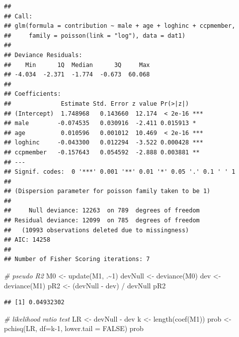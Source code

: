 \documentclass[
]{ctexart}
\newenvironment{Shaded}{\begin{snugshade}}{\end{snugshade}}
\newcommand{\AttributeTok}[1]{\textcolor[rgb]{0.77,0.63,0.00}{#1}}
\newcommand{\CommentTok}[1]{\textcolor[rgb]{0.56,0.35,0.01}{\textit{#1}}}
\newcommand{\ConstantTok}[1]{\textcolor[rgb]{0.00,0.00,0.00}{#1}}
\newcommand{\DecValTok}[1]{\textcolor[rgb]{0.00,0.00,0.81}{#1}}
\newcommand{\FunctionTok}[1]{\textcolor[rgb]{0.00,0.00,0.00}{#1}}
\newcommand{\NormalTok}[1]{#1}
\newcommand{\OtherTok}[1]{\textcolor[rgb]{0.56,0.35,0.01}{#1}}
\newcommand{\SpecialCharTok}[1]{\textcolor[rgb]{0.00,0.00,0.00}{#1}}
\begin{document}
\begin{verbatim}
## 
## Call:
## glm(formula = contribution ~ male + age + loghinc + ccpmember, 
##     family = poisson(link = "log"), data = dat1)
## 
## Deviance Residuals: 
##    Min      1Q  Median      3Q     Max  
## -4.034  -2.371  -1.774  -0.673  60.068  
## 
## Coefficients:
##              Estimate Std. Error z value Pr(>|z|)    
## (Intercept)  1.748968   0.143660  12.174  < 2e-16 ***
## male        -0.074535   0.030916  -2.411 0.015913 *  
## age          0.010596   0.001012  10.469  < 2e-16 ***
## loghinc     -0.043300   0.012294  -3.522 0.000428 ***
## ccpmember   -0.157643   0.054592  -2.888 0.003881 ** 
## ---
## Signif. codes:  0 '***' 0.001 '**' 0.01 '*' 0.05 '.' 0.1 ' ' 1
## 
## (Dispersion parameter for poisson family taken to be 1)
## 
##     Null deviance: 12263  on 789  degrees of freedom
## Residual deviance: 12099  on 785  degrees of freedom
##   (10993 observations deleted due to missingness)
## AIC: 14258
## 
## Number of Fisher Scoring iterations: 7
\end{verbatim}

\begin{Shaded}
\begin{Highlighting}[]
\CommentTok{\# pseudo R2}
\NormalTok{M0 }\OtherTok{\textless{}{-}} \FunctionTok{update}\NormalTok{(M1, .}\SpecialCharTok{\textasciitilde{}}\DecValTok{1}\NormalTok{)}
\NormalTok{devNull }\OtherTok{\textless{}{-}} \FunctionTok{deviance}\NormalTok{(M0)}
\NormalTok{dev }\OtherTok{\textless{}{-}} \FunctionTok{deviance}\NormalTok{(M1)}
\NormalTok{pR2 }\OtherTok{\textless{}{-}}\NormalTok{ (devNull }\SpecialCharTok{{-}}\NormalTok{ dev) }\SpecialCharTok{/}\NormalTok{ devNull}
\NormalTok{pR2}
\end{Highlighting}
\end{Shaded}

\begin{verbatim}
## [1] 0.04932302
\end{verbatim}

\begin{Shaded}
\begin{Highlighting}[]
\CommentTok{\# likelihood ratio test}
\NormalTok{LR }\OtherTok{\textless{}{-}}\NormalTok{ devNull }\SpecialCharTok{{-}}\NormalTok{ dev}
\NormalTok{k }\OtherTok{\textless{}{-}} \FunctionTok{length}\NormalTok{(}\FunctionTok{coef}\NormalTok{(M1))}
\NormalTok{prob }\OtherTok{\textless{}{-}} \FunctionTok{pchisq}\NormalTok{(LR, }\AttributeTok{df=}\NormalTok{k}\DecValTok{{-}1}\NormalTok{, }\AttributeTok{lower.tail =} \ConstantTok{FALSE}\NormalTok{)}
\NormalTok{prob}
\end{Highlighting}
\end{Shaded}
\end{document}
